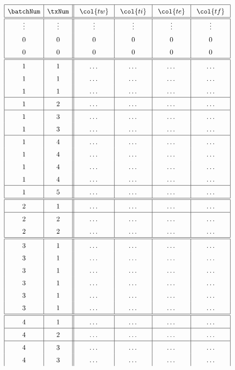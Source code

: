 \begin{figure}
\centering
\[
\renewcommand{\arraystretch}{1.5}
\begin{array}{|c|c||c|c|c|c|}
	\hline
	\batchNum & \txNum & ~ \col{tw} ~ & ~ \col{ti} ~ & ~ \col{te} ~ & ~ \col{tf} ~\\
	\hline\hline
	\vdots & \vdots & \vdots & \vdots & \vdots & \vdots \\
	0 & 0 & 0 & 0 & 0 & 0 \\
	0 & 0 & 0 & 0 & 0 & 0 \\
	\hline\hline
	1 & 1 & \dots & \dots & \dots & \dots \\
	1 & 1 & \dots & \dots & \dots & \dots \\
	1 & 1 & \dots & \dots & \dots & \dots \\
	\hline
	1 & 2 & \dots & \dots & \dots & \dots \\
	\hline
	1 & 3 & \dots & \dots & \dots & \dots \\
	1 & 3 & \dots & \dots & \dots & \dots \\
	\hline
	1 & 4 & \dots & \dots & \dots & \dots \\
	1 & 4 & \dots & \dots & \dots & \dots \\
	1 & 4 & \dots & \dots & \dots & \dots \\
	1 & 4 & \dots & \dots & \dots & \dots \\
	\hline
	1 & 5 & \dots & \dots & \dots & \dots \\
	\hline\hline
	2 & 1 & \dots & \dots & \dots & \dots \\
	\hline
	2 & 2 & \dots & \dots & \dots & \dots \\
	2 & 2 & \dots & \dots & \dots & \dots \\
	\hline\hline
	3 & 1 & \dots & \dots & \dots & \dots \\
	3 & 1 & \dots & \dots & \dots & \dots \\
	3 & 1 & \dots & \dots & \dots & \dots \\
	3 & 1 & \dots & \dots & \dots & \dots \\
	3 & 1 & \dots & \dots & \dots & \dots \\
	3 & 1 & \dots & \dots & \dots & \dots \\
	\hline\hline
	4 & 1 & \dots & \dots & \dots & \dots \\
	\hline
	4 & 2 & \dots & \dots & \dots & \dots \\
	\hline
	4 & 3 & \dots & \dots & \dots & \dots \\
	4 & 3 & \dots & \dots & \dots & \dots \\

\end{array}\]
\end{figure}
